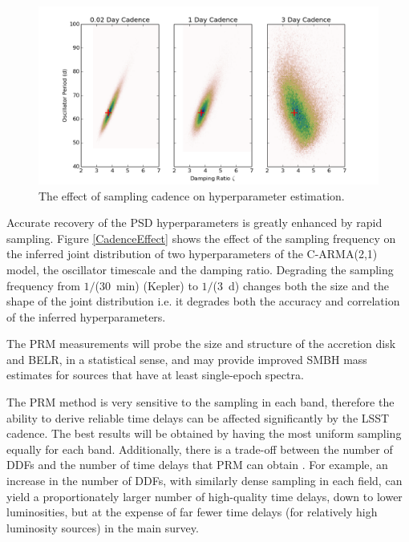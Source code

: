 \begin{figure}
\includegraphics[width=5.0in]{figs/agn/AGN_Variability_00.png}
\caption{The effect of sampling cadence on hyperparameter estimation.}
\label{CadenceEffec}
\end{figure}

Accurate recovery of the PSD hyperparameters is greatly enhanced by rapid sampling. Figure \ref{CadenceEffect}
shows the effect of the sampling frequency on the inferred joint distribution of two
 hyperparameters of the C-ARMA(2,1) model, the 
oscillator timescale and the damping ratio. Degrading the sampling frequency from $1/$($30$~min) 
(Kepler) to $1/$($3$~d) changes both the size and the shape of the joint distribution i.e. it degrades both 
the accuracy and correlation of the inferred hyperparameters. 

The PRM measurements will probe the size and structure of the
accretion disk and BELR, in a statistical sense, and may provide
improved SMBH mass estimates for sources that have at least
single-epoch spectra. 

The PRM method is very sensitive to the sampling in each band,
therefore the ability to derive reliable time delays can be affected
significantly by the LSST cadence. The best results will be obtained
by having the most uniform sampling equally for each band.
Additionally, there is a trade-off between the number of DDFs and the
number of time delays that PRM can obtain \citep{CheloucheEtal2014}.
For example, an increase in the number of DDFs, with similarly dense
sampling in each field, can yield a proportionately larger number of
high-quality time delays, down to lower luminosities, but at the
expense of far fewer time delays (for relatively high luminosity
sources) in the main survey.

